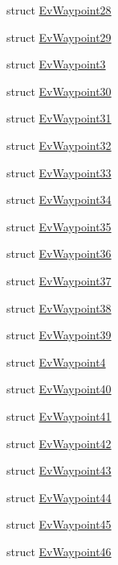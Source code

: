 \begin{DoxyCompactItemize}
\item 
struct \hyperlink{structcl__move__base__z_1_1EvWaypoint28}{Ev\+Waypoint28}
\item 
struct \hyperlink{structcl__move__base__z_1_1EvWaypoint29}{Ev\+Waypoint29}
\item 
struct \hyperlink{structcl__move__base__z_1_1EvWaypoint3}{Ev\+Waypoint3}
\item 
struct \hyperlink{structcl__move__base__z_1_1EvWaypoint30}{Ev\+Waypoint30}
\item 
struct \hyperlink{structcl__move__base__z_1_1EvWaypoint31}{Ev\+Waypoint31}
\item 
struct \hyperlink{structcl__move__base__z_1_1EvWaypoint32}{Ev\+Waypoint32}
\item 
struct \hyperlink{structcl__move__base__z_1_1EvWaypoint33}{Ev\+Waypoint33}
\item 
struct \hyperlink{structcl__move__base__z_1_1EvWaypoint34}{Ev\+Waypoint34}
\item 
struct \hyperlink{structcl__move__base__z_1_1EvWaypoint35}{Ev\+Waypoint35}
\item 
struct \hyperlink{structcl__move__base__z_1_1EvWaypoint36}{Ev\+Waypoint36}
\item 
struct \hyperlink{structcl__move__base__z_1_1EvWaypoint37}{Ev\+Waypoint37}
\item 
struct \hyperlink{structcl__move__base__z_1_1EvWaypoint38}{Ev\+Waypoint38}
\item 
struct \hyperlink{structcl__move__base__z_1_1EvWaypoint39}{Ev\+Waypoint39}
\item 
struct \hyperlink{structcl__move__base__z_1_1EvWaypoint4}{Ev\+Waypoint4}
\item 
struct \hyperlink{structcl__move__base__z_1_1EvWaypoint40}{Ev\+Waypoint40}
\item 
struct \hyperlink{structcl__move__base__z_1_1EvWaypoint41}{Ev\+Waypoint41}
\item 
struct \hyperlink{structcl__move__base__z_1_1EvWaypoint42}{Ev\+Waypoint42}
\item 
struct \hyperlink{structcl__move__base__z_1_1EvWaypoint43}{Ev\+Waypoint43}
\item 
struct \hyperlink{structcl__move__base__z_1_1EvWaypoint44}{Ev\+Waypoint44}
\item 
struct \hyperlink{structcl__move__base__z_1_1EvWaypoint45}{Ev\+Waypoint45}
\item 
struct \hyperlink{structcl__move__base__z_1_1EvWaypoint46}{Ev\+Waypoint46}
\item 

\end{DoxyCompactItemize}
